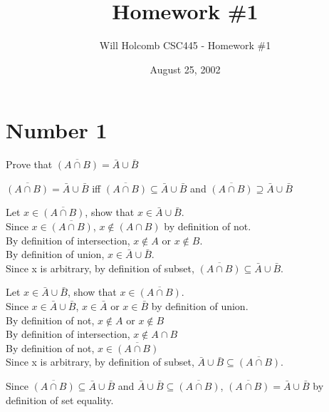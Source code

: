 \documentclass[12pt,a4paper,twoside]{article}  %
\author{Will Holcomb \small{CSC445 - Homework \#1}}
\title{Homework \#1}
\date{August 25, 2002}
\begin{document}
\maketitle

\section{Number 1}

Prove that $\overline{(A \cap B)} = \bar A \cup \bar B$

$\overline{(A \cap B)} = \bar A \cup \bar B$ iff
$\overline{(A \cap B)} \subseteq \bar A \cup \bar B$ and
$\overline{(A \cap B)} \supseteq \bar A \cup \bar B$

Let $x \in \overline{(A \cap B)}$, show that $x \in \bar A \cup \bar B$. \\
 Since $x \in \overline{(A \cap B)}$, $x \not \in (A \cap B)$
 by definition of not. \\
 By definition of intersection, $x \not \in A$ or $x \not \in B$. \\
 By definition of union, $x \in \bar A \cup \bar B$. \\
 Since x is arbitrary, by definition of subset,
 $\overline{(A \cap B)} \subseteq \bar A \cup \bar B$.

Let $x \in \bar A \cup \bar B$, show that $x \in \overline{(A \cap B)}$. \\
 Since $x \in \bar A \cup \bar B$, $x \in \bar A$ or $x \in \bar B$
 by definition of union. \\
 By definition of not, $x \not \in A$ or $x \not \in B$  \\
 By definition of intersection, $x \not \in A \cap B$ \\
 By definition of not, $x \in \overline{(A \cap B)}$ \\
 Since x is arbitrary, by definition of subset,
 $\bar A \cup \bar B \subseteq \overline{(A \cap B)}$.

Since $\overline{(A \cap B)} \subseteq \bar A \cup \bar B$ and 
 $\bar A \cup \bar B \subseteq \overline{(A \cap B)}$, 
 $\overline{(A \cap B)} = \bar A \cup \bar B$ by definition of set equality.
\end{document}
